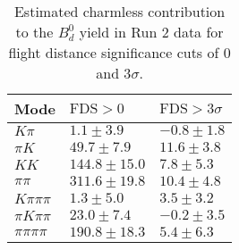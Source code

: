 \begin{table}[h]
  \centering
  \begin{tabular}{lll}
      \toprule
      Mode & $\mathrm{FDS} > 0$ & $\mathrm{FDS} > 3\sigma$ \\
      \midrule
      $K\pi$ & $1.1 \pm 3.9$ & $-0.8 \pm 1.8$ \\
      $\pi K$ & $49.7 \pm 7.9$ & $11.6 \pm 3.8$ \\
      $KK$ & $144.8 \pm 15.0$ & $7.8 \pm 5.3$ \\
      $\pi\pi$ & $311.6 \pm 19.8$ & $10.4 \pm 4.8$ \\
      $K\pi\pi\pi$ & $1.3 \pm 5.0$ & $3.5 \pm 3.2$ \\
      $\pi K\pi\pi$ & $23.0 \pm 7.4$ & $-0.2 \pm 3.5$ \\
      $\pi\pi\pi\pi$ & $190.8 \pm 18.3$ & $5.4 \pm 6.3$ \\
      \bottomrule
  \end{tabular}
  \caption{\small Estimated charmless contribution to the $B^{0}_{d}$ yield in Run 2 data for flight distance significance cuts of 0  and $3\sigma$.}
\label{tab:charmless_yields_Bd_run_2}
\end{table}
